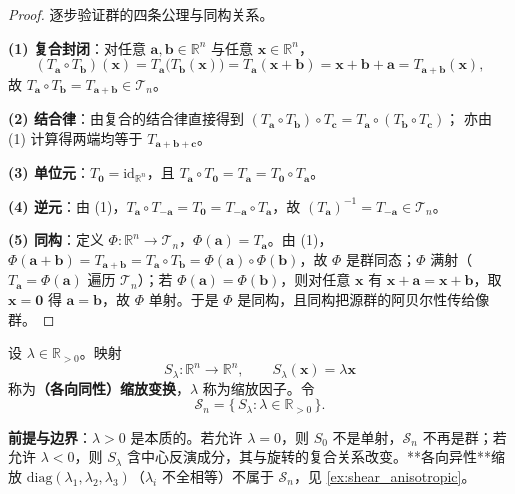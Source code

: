 \begin{proof}
逐步验证群的四条公理与同构关系。

\textbf{(1) 复合封闭}：对任意 $\mathbf{a}, \mathbf{b} \in \mathbb{R}^n$ 与任意 $\mathbf{x} \in \mathbb{R}^n$，
\[
(T_{\mathbf{a}} \circ T_{\mathbf{b}})(\mathbf{x})
= T_{\mathbf{a}}\bigl(T_{\mathbf{b}}(\mathbf{x})\bigr)
= T_{\mathbf{a}}(\mathbf{x} + \mathbf{b})
= \mathbf{x} + \mathbf{b} + \mathbf{a}
= T_{\mathbf{a}+\mathbf{b}}(\mathbf{x}),
\]
故 $T_{\mathbf{a}} \circ T_{\mathbf{b}} = T_{\mathbf{a}+\mathbf{b}} \in \mathcal{T}_n$。

\textbf{(2) 结合律}：由复合的结合律直接得到
$(T_{\mathbf a}\circ T_{\mathbf b})\circ T_{\mathbf c}=T_{\mathbf a}\circ(T_{\mathbf b}\circ T_{\mathbf c})$；
亦由 (1) 计算得两端均等于 $T_{\mathbf a+\mathbf b+\mathbf c}$。

\textbf{(3) 单位元}：$T_{\mathbf{0}} = \mathrm{id}_{\mathbb R^n}$，且 $T_{\mathbf a}\circ T_{\mathbf 0}=T_{\mathbf a}=T_{\mathbf 0}\circ T_{\mathbf a}$。

\textbf{(4) 逆元}：由 (1)，$T_{\mathbf{a}} \circ T_{-\mathbf{a}} = T_{\mathbf{0}} = T_{-\mathbf{a}} \circ T_{\mathbf{a}}$，故 $(T_{\mathbf a})^{-1} = T_{-\mathbf a} \in \mathcal T_n$。

\textbf{(5) 同构}：定义 $\Phi: \mathbb{R}^n \to \mathcal{T}_n$，$\Phi(\mathbf{a}) = T_{\mathbf{a}}$。由 (1)，$\Phi(\mathbf{a}+\mathbf{b}) = T_{\mathbf{a}+\mathbf{b}} = T_{\mathbf{a}} \circ T_{\mathbf{b}} = \Phi(\mathbf{a}) \circ \Phi(\mathbf{b})$，故 $\Phi$ 是群同态；$\Phi$ 满射（$T_{\mathbf a}=\Phi(\mathbf a)$ 遍历 $\mathcal T_n$）；若 $\Phi(\mathbf{a}) = \Phi(\mathbf{b})$，则对任意 $\mathbf x$ 有 $\mathbf x+\mathbf a=\mathbf x+\mathbf b$，取 $\mathbf x=\mathbf 0$ 得 $\mathbf a=\mathbf b$，故 $\Phi$ 单射。于是 $\Phi$ 是同构，且同构把源群的阿贝尔性传给像群。
\end{proof}

\begin{definition}[缩放变换与缩放群]\label{def:scaling_map}
设 $\lambda \in \mathbb{R}_{>0}$。映射
\[
S_{\lambda}: \mathbb{R}^n \to \mathbb{R}^n, \qquad S_{\lambda}(\mathbf{x}) = \lambda \mathbf{x}
\]
称为\textbf{（各向同性）缩放变换}，$\lambda$ 称为缩放因子。令
\[
\mathcal{S}_n = \{\, S_{\lambda} : \lambda \in \mathbb{R}_{>0} \,\}.
\]

\textbf{前提与边界}：$\lambda > 0$ 是本质的。若允许 $\lambda = 0$，则 $S_0$ 不是单射，$\mathcal S_n$ 不再是群；若允许 $\lambda < 0$，则 $S_\lambda$ 含中心反演成分，其与旋转的复合关系改变。**各向异性**缩放 $\mathrm{diag}(\lambda_1,\lambda_2,\lambda_3)$（$\lambda_i$ 不全相等）不属于 $\mathcal S_n$，见 \cref{ex:shear_anisotropic}。
\end{definition}

